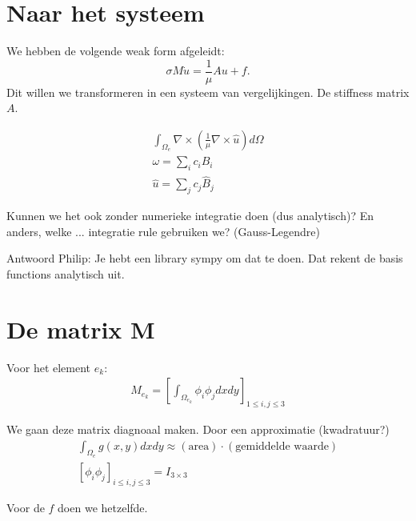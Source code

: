 \documentclass[11pt]{report}
\begin{document}
\section{Naar het systeem}

We hebben de volgende weak form afgeleidt:
\begin{equation}
    \sigma M \dot u = \frac{1}{\mu}A u + f.
\end{equation}
Dit willen we transformeren in een systeem van vergelijkingen. De stiffness matrix $A$.

\begin{align*}
    \int_{\Omega_e} \nabla \times \left(\frac{1}{\mu} \nabla \times \hat u\right) d \Omega \\
    \omega = \sum_i c_i B_i\\
    \hat u = \sum_j c_j \hat B_j
\end{align*}

Kunnen we het ook zonder numerieke integratie doen (dus analytisch)? En anders, welke ... integratie rule gebruiken we? (Gauss-Legendre)

Antwoord Philip: Je hebt een library sympy om dat te doen. Dat rekent de basis functions analytisch uit.

\section{De matrix M}

Voor het element $e_k$:
\begin{align*}
    M_{e_k} = \left[\int_{\Omega_{e_k}}\phi_i\phi_jdxdy\right]_{1 \leq i, j \leq 3}
\end{align*}

We gaan deze matrix diagnoaal maken. Door een approximatie (kwadratuur?)
\begin{align*}
    \int_{\Omega_e}g(x,y)dxdy \approx (\text{area}) \cdot (\text{gemiddelde waarde}) \\
    \left[\phi_i\phi_j\right]_{i \leq i,j \leq 3} = I_{3 \times 3}
\end{align*}

Voor de $f$ doen we hetzelfde.
\end{document}
